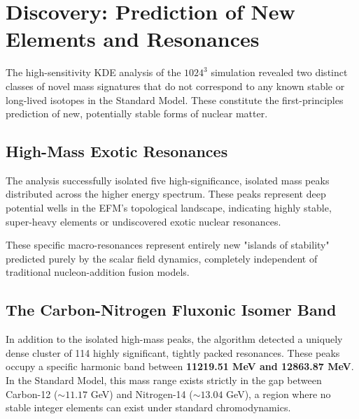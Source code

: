 \documentclass[11pt, twoside]{article}
\begin{document}
\section{Discovery: Prediction of New Elements and Resonances}

The high-sensitivity KDE analysis of the $1024^3$ simulation revealed two distinct classes of novel mass signatures that do not correspond to any known stable or long-lived isotopes in the Standard Model. These constitute the first-principles prediction of new, potentially stable forms of nuclear matter.

\subsection{High-Mass Exotic Resonances}
The analysis successfully isolated five high-significance, isolated mass peaks distributed across the higher energy spectrum. These peaks represent deep potential wells in the EFM's topological landscape, indicating highly stable, super-heavy elements or undiscovered exotic nuclear resonances.

\begin{table}[H]
\centering
\caption{First-Principles Prediction of High-Mass Exotic Resonances}
\label{tab:high_mass_resonances}
\end{table}

These specific macro-resonances represent entirely new "islands of stability" predicted purely by the scalar field dynamics, completely independent of traditional nucleon-addition fusion models.

\subsection{The Carbon-Nitrogen Fluxonic Isomer Band}
In addition to the isolated high-mass peaks, the algorithm detected a uniquely dense cluster of 114 highly significant, tightly packed resonances. These peaks occupy a specific harmonic band between \textbf{11219.51 MeV and 12863.87 MeV}. In the Standard Model, this mass range exists strictly in the gap between Carbon-12 ($\sim 11.17$ GeV) and Nitrogen-14 ($\sim 13.04$ GeV), a region where no stable integer elements can exist under standard chromodynamics.
\end{document}
